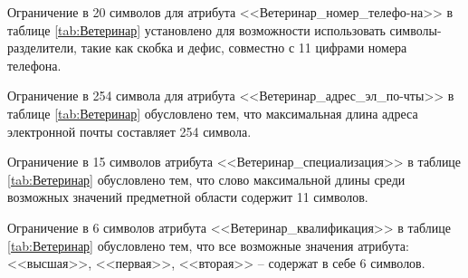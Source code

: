 \documentclass[a4paper]{article}
\begin{document}
Ограничение в 20 символов для атрибута <<Ветеринар\_номер\_телефо-на>> в таблице \ref{tab:Ветеринар} установлено для возможности использовать символы-разделители, такие как скобка и дефис, совместно с 11 цифрами номера телефона.

Ограничение в 254 символа для атрибута <<Ветеринар\_адрес\_эл\_по-чты>> в таблице \ref{tab:Ветеринар} обусловлено тем, что максимальная длина адреса электронной почты составляет 254 символа. 

Ограничение в 15 символов атрибута <<Ветеринар\_специализация>> в таблице \ref{tab:Ветеринар} обусловлено тем, что слово максимальной длины среди возможных значений предметной области содержит 11 символов.

Ограничение в 6 символов атрибута <<Ветеринар\_квалификация>> в таблице \ref{tab:Ветеринар} обусловлено тем, что все возможные значения атрибута: <<высшая>>, <<первая>>, <<вторая>> -- содержат в себе 6 символов.

\begin{table}[H]
  \caption{Ветеринар - veterinarians}
  \label{tab:Ветеринар}
\end{table}
\end{document}
